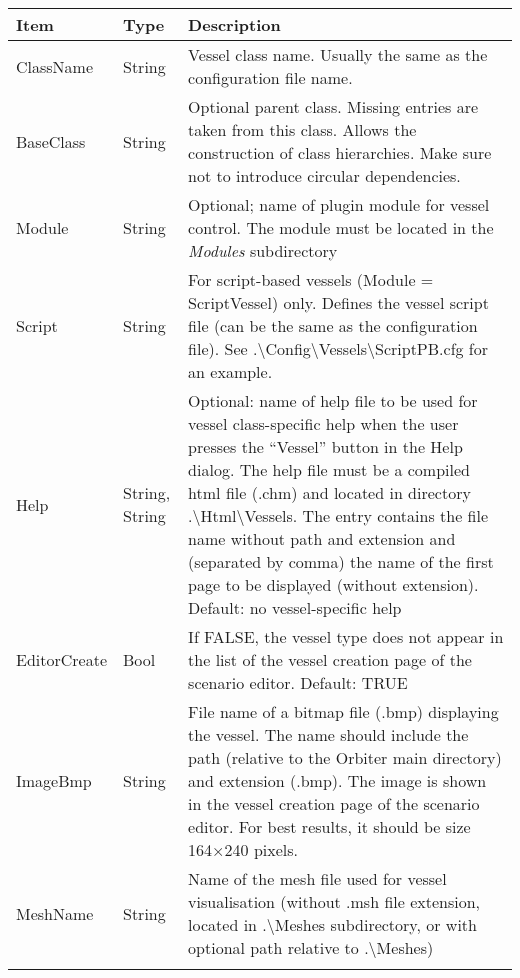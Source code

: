 \documentclass[Orbiter Developer Manual.tex]{subfiles}
\begin{document}
	\begin{longtable}{ |p{}|p{}|p{}| }
	\hline\rule{0pt}{2ex}
	\textbf{Item} & \textbf{Type} & \textbf{Description}\\
	\hline\rule{0pt}{2ex}
	ClassName & String & Vessel class name. Usually the same as the configuration file name.\\
	\hline\rule{0pt}{2ex}
	BaseClass & String & Optional parent class. Missing entries are taken from this class. Allows the construction of class hierarchies. Make sure not to introduce circular dependencies.\\
	\hline\rule{0pt}{2ex}
	Module & String & Optional; name of plugin module for vessel control. The module must be located in the \textit{Modules} subdirectory\\
	\hline\rule{0pt}{2ex}
	Script & String & For script-based vessels (Module = ScriptVessel) only. Defines the vessel script file (can be the same as the configuration file). See .\textbackslash Config\textbackslash Vessels\textbackslash ScriptPB.cfg for an example.\\
	\hline\rule{0pt}{2ex}
	Help & String, String & Optional: name of help file to be used for vessel class-specific help when the user presses the “Vessel” button in the Help dialog. The help file must be a compiled html file (.chm) and located in directory .\textbackslash Html\textbackslash Vessels. The entry contains the file name without path and extension and (separated by comma) the name of the first page to be displayed (without extension). Default: no vessel-specific help\\
	\hline\rule{0pt}{2ex}
	EditorCreate & Bool & If FALSE, the vessel type does not appear in the list of the vessel creation page of the scenario editor. Default: TRUE\\
	\hline\rule{0pt}{2ex}
	ImageBmp & String & File name of a bitmap file (.bmp) displaying the vessel. The name should include the path (relative to the Orbiter main directory) and extension (.bmp). The image is shown in the vessel creation page of the scenario editor. For best results, it should be size 164×240 pixels.\\
	\hline\rule{0pt}{2ex}
	MeshName & String & Name of the mesh file used for vessel visualisation (without .msh file extension, located in .\textbackslash Meshes subdirectory, or with optional path relative to .\textbackslash Meshes)\\
	\hline\rule{0pt}{2ex}

\end{longtable}
\end{document}
